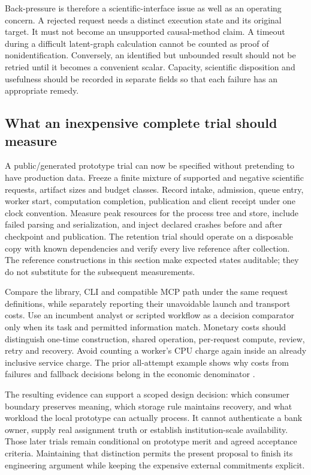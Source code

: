 Back-pressure is therefore a scientific-interface issue as well as an
operating concern. A rejected request needs a distinct execution state and
its original target. It must not become an unsupported causal-method claim.
A timeout during a difficult latent-graph calculation cannot be counted as
proof of nonidentification. Conversely, an identified but unbounded result
should not be retried until it becomes a convenient scalar. Capacity,
scientific disposition and usefulness should be recorded in separate fields
so that each failure has an appropriate remedy.

\subsection{What an inexpensive complete trial should measure}

A public/generated prototype trial can now be specified without pretending
to have production data. Freeze a finite mixture of supported and negative
scientific requests, artifact sizes and budget classes. Record intake,
admission, queue entry, worker start, computation completion, publication
and client receipt under one clock convention. Measure peak resources for
the process tree and store, include failed parsing and serialization, and
inject declared crashes before and after checkpoint and publication. The
retention trial should operate on a disposable copy with known dependencies
and verify every live reference after collection. The reference constructions
in this section make expected states auditable; they do not substitute for
the subsequent measurements.

Compare the library, CLI and compatible MCP path under the same request
definitions, while separately reporting their unavoidable launch and
transport costs. Use an incumbent analyst or scripted workflow as a
decision comparator only when its task and permitted information match.
Monetary costs should distinguish one-time construction, shared operation,
per-request compute, review, retry and recovery. Avoid counting a worker's
CPU charge again inside an already inclusive service charge. The prior
all-attempt example shows why costs from failures and fallback decisions
belong in the economic denominator \citep{exec13_ops_exact}.

The resulting evidence can support a scoped design decision: which consumer
boundary preserves meaning, which storage rule maintains recovery, and what
workload the local prototype can actually process. It cannot authenticate a
bank owner, supply real assignment truth or establish institution-scale
availability. Those later trials remain conditional on prototype merit and
agreed acceptance criteria. Maintaining that distinction permits the present
proposal to finish its engineering argument while keeping the expensive
external commitments explicit.
\label{exec17:i4-capacity-end}
